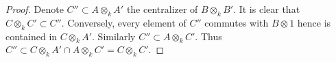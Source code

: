 \documentclass[10pt,a4paper]{amsart}
\theoremstyle{plain}
\theoremstyle{definition}
\theoremstyle{remark}
\numberwithin{equation}{subsection}
\begin{document}
\begin{proof}
Denote $C'' \subset A \otimes_k A'$ the centralizer of $B \otimes_k B'$.
It is clear that $C \otimes_k C' \subset C''$. Conversely, every element
of $C''$ commutes with $B \otimes 1$ hence is contained in $C \otimes_k A'$.
Similarly $C'' \subset A \otimes_k C'$. Thus
$C'' \subset C \otimes_k A' \cap A \otimes_k C' = C \otimes_k C'$.
\end{proof}
\end{document}
